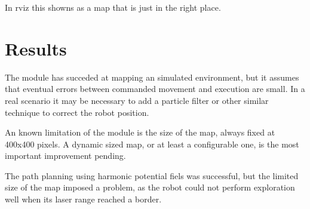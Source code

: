 \documentclass[a4paper,twocolumn]{article}
\begin{document}
    In rviz this showns as a map that is just in the right place.

\section{Results}
    The module has succeded at mapping an simulated environment, but it assumes that eventual errors between commanded movement and execution are small. In a real scenario it may be necessary to add a particle filter or other similar technique to correct the robot position.

    An known limitation of the module is the size of the map, always fixed at 400x400 pixels. A dynamic sized map, or at least a configurable one, is the most important improvement pending.
    
    The path planning using harmonic potential fiels was successful, but the limited size of the map imposed a problem, as the robot could not perform exploration well when its laser range reached a border.

% 
% 
\end{document}
